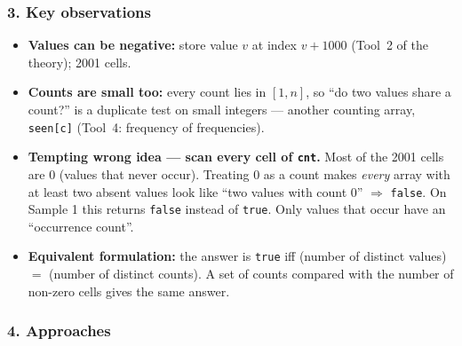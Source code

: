 \subsubsection*{3. Key observations}

\begin{itemize}[leftmargin=*]
    \item \textbf{Values can be negative:} store value $v$ at index $v + 1000$ (Tool~2 of the theory); 2001 cells.
    \item \textbf{Counts are small too:} every count lies in $[1, n]$, so ``do two values share a count?'' is a duplicate test on small integers --- another counting array, \texttt{seen[c]} (Tool~4: frequency of frequencies).
    \item \textbf{Tempting wrong idea --- scan every cell of \texttt{cnt}.} Most of the 2001 cells are 0 (values that never occur). Treating 0 as a count makes \emph{every} array with at least two absent values look like ``two values with count 0'' $\Rightarrow$ \texttt{false}. On Sample 1 this returns \texttt{false} instead of \texttt{true}. Only values that occur have an ``occurrence count''.
    \item \textbf{Equivalent formulation:} the answer is \texttt{true} iff (number of distinct values) $=$ (number of distinct counts). A set of counts compared with the number of non-zero cells gives the same answer.
\end{itemize}

\begin{diagrambox}
\end{diagrambox}

\subsubsection*{4. Approaches}


